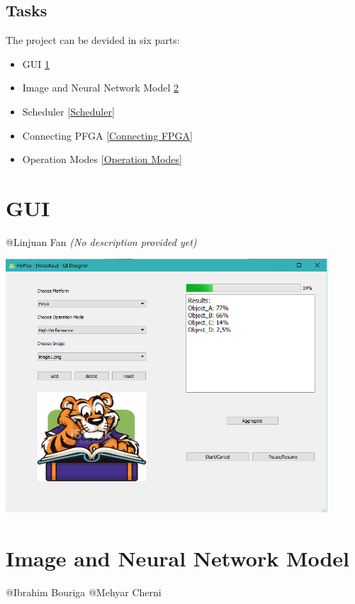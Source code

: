 \documentclass[parskip=full]{scrartcl}
\newcommand\tab[1][1cm]{\hspace*{#1}}
\begin{document}
	\subsection{Tasks}
	\tab The project can be devided in six parts:
	\tab \begin{itemize}
	\item GUI \ref{GUI}
	\item Image and Neural Network Model  \ref{Image and Neural Network Model}
	\item Scheduler \ref{Scheduler}
	\item Connecting PFGA \ref{Connecting FPGA}
	\item Operation Modes  \ref{Operation Modes}
	\end{itemize}
	
\section{GUI} \label{GUI}
	@Linjuan Fan \textit{(No description provided yet)}
	\begin{center}
		\includegraphics[width=0.9\textwidth]{NewMainWindow}
	\end{center}


\pagebreak

\section {Image and Neural Network Model} \label{Image and Neural Network Model}
	@Ibrahim Bouriga @Mehyar Cherni
	
\end{document}
